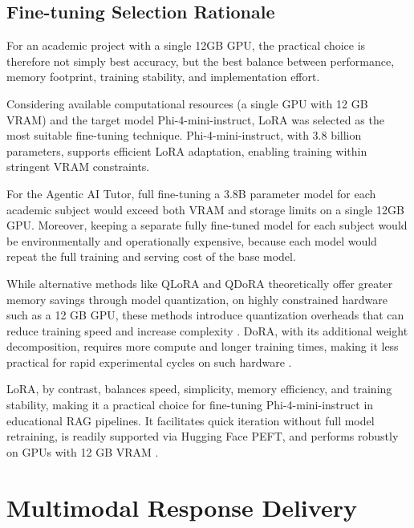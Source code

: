 \subsection{Fine-tuning Selection Rationale}

For an academic project with a single 12GB GPU, the practical choice is therefore not simply best accuracy, but the best balance between performance, memory footprint, training stability, and implementation effort.

Considering available computational resources (a single GPU with 12 GB VRAM) and the target model Phi-4-mini-instruct, LoRA was selected as the most suitable fine-tuning technique. Phi-4-mini-instruct, with 3.8 billion parameters, supports efficient LoRA adaptation, enabling training within stringent VRAM constraints.

For the Agentic AI Tutor, full fine-tuning a 3.8B parameter model for each academic subject would exceed both VRAM and storage limits on a single 12GB GPU. Moreover, keeping a separate fully fine-tuned model for each subject would be environmentally and operationally expensive, because each model would repeat the full training and serving cost of the base model.

While alternative methods like QLoRA and QDoRA theoretically offer greater memory savings through model quantization, on highly constrained hardware such as a 12 GB GPU, these methods introduce quantization overheads that can reduce training speed and increase complexity \parencite{FineTuni58:online}. DoRA, with its additional weight decomposition, requires more compute and longer training times, making it less practical for rapid experimental cycles on such hardware \parencite{FineTuni58:online}.

LoRA, by contrast, balances speed, simplicity, memory efficiency, and training stability, making it a practical choice for fine-tuning Phi-4-mini-instruct in educational RAG pipelines. It facilitates quick iteration without full model retraining, is readily supported via Hugging Face PEFT, and performs robustly on GPUs with 12 GB VRAM \parencite{FineTuni58:online,2106096835:online}.

\section{Multimodal Response Delivery}

